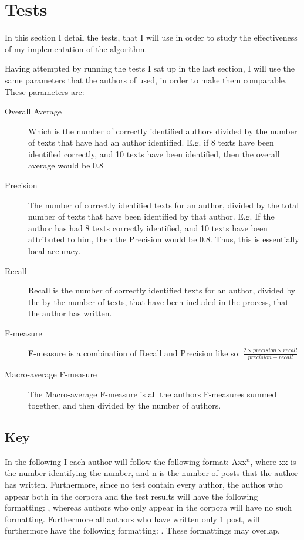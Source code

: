 \section{Tests}
\label{tests}

In this section I detail the tests, that I will use in order to study the effectiveness of my implementation of the algorithm.

Having attempted by running the tests I sat up in the last section, I will use the same parameters that the authors of \cite{nr4} used, in order to make them comparable. These parameters are: 

\begin{description}
\item[Overall Average] Which is the number of correctly identified authors divided by the number of texts that have had an author identified. E.g. if 8 texts have been identified correctly, and 10 texts have been identified, then the overall average would be 0.8 

\item[Precision] The number of correctly identified texts for an author, divided by the total number of texts that have been identified by that author. E.g. If the author has had 8 texts correctly identified, and 10 texts have been attributed to him, then the Precision would be 0.8. Thus, this is essentially local accuracy.

\item[Recall] Recall is the number of correctly identified texts for an author, divided by the by the number of texts, that have been included in the process, that the author has written.

\item[F-measure] F-measure is a combination of Recall and Precision like so: $\frac{2 \times precision \times recall}{precision+recall}$ 

\item[Macro-average F-measure] The Macro-average F-measure is all the authors F-measures summed together, and then divided by the number of authors. 
\end{description}

\subsection{Key}
In the following I each author will follow the following format: Axx$^{n}$, where xx is the number identifying the number, and n is the number of posts that the author has written. Furthermore, since no test contain every author, the authos who appear both in the corpora and the test results will have the following formatting: , whereas authors who only appear in the corpora will have no such formatting. Furthermore all authors who have written only 1 post, will furthermore have the following formatting: . These formattings may overlap.\\

